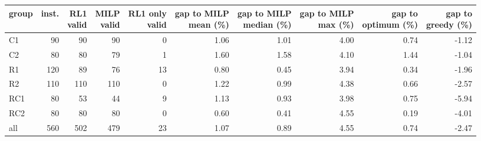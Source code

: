 \begin{tabular}{@{}lrrrrrrrrr@{}}
\toprule
group & inst. & \shortstack[r]{RL1\\valid} & \shortstack[r]{MILP\\valid} & \shortstack[r]{RL1 only\\valid} & \shortstack[r]{gap to MILP\\mean (\%)} & \shortstack[r]{gap to MILP\\median (\%)} & \shortstack[r]{gap to MILP\\max (\%)} & \shortstack[r]{gap to\\optimum (\%)} & \shortstack[r]{gap to\\greedy (\%)} \\
\midrule
C1 & 90 & 90 & 90 & 0 & 1.06 & 1.01 & 4.00 & 0.74 & -1.12 \\
C2 & 80 & 80 & 79 & 1 & 1.60 & 1.58 & 4.10 & 1.44 & -1.04 \\
R1 & 120 & 89 & 76 & 13 & 0.80 & 0.45 & 3.94 & 0.34 & -1.96 \\
R2 & 110 & 110 & 110 & 0 & 1.22 & 0.99 & 4.38 & 0.66 & -2.57 \\
RC1 & 80 & 53 & 44 & 9 & 1.13 & 0.93 & 3.98 & 0.75 & -5.94 \\
RC2 & 80 & 80 & 80 & 0 & 0.60 & 0.41 & 4.55 & 0.19 & -4.01 \\
\midrule
all & 560 & 502 & 479 & 23 & 1.07 & 0.89 & 4.55 & 0.74 & -2.47 \\
\bottomrule
\end{tabular}
